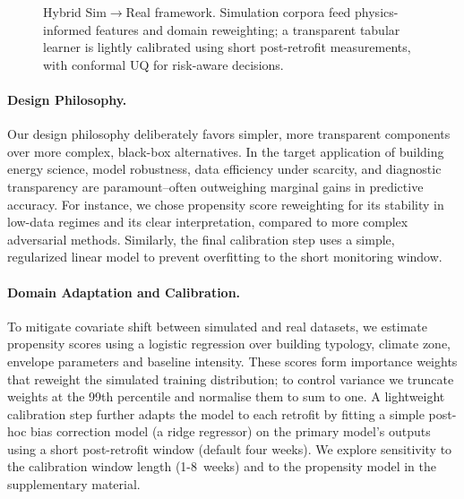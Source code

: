 ﻿\documentclass{article}
\begin{document}
\begin{figure}[t]
\caption{Hybrid Sim$\rightarrow$Real framework. Simulation corpora feed physics-informed features and domain reweighting; a transparent tabular learner is lightly calibrated using short post-retrofit measurements, with conformal UQ for risk-aware decisions.}
\label{fig:hybrid_stack}
\end{figure}

\paragraph{Design Philosophy.} Our design philosophy deliberately favors simpler, more transparent components over more complex, black-box alternatives. In the target application of building energy science, model robustness, data efficiency under scarcity, and diagnostic transparency are paramount--often outweighing marginal gains in predictive accuracy. For instance, we chose propensity score reweighting for its stability in low-data regimes and its clear interpretation, compared to more complex adversarial methods. Similarly, the final calibration step uses a simple, regularized linear model to prevent overfitting to the short monitoring window.

\paragraph{Domain Adaptation and Calibration.} To mitigate covariate shift between simulated and real datasets, we estimate propensity scores using a logistic regression over building typology, climate zone, envelope parameters and baseline intensity.
These scores form importance weights that reweight the simulated training distribution;
to control variance we truncate weights at the 99th percentile and normalise them to sum to one.
A lightweight calibration step further adapts the model to each retrofit by fitting a simple post-hoc bias correction model (a ridge regressor) on the primary model's outputs using a short post-retrofit window (default four weeks).
We explore sensitivity to the calibration window length (1-8~weeks) and to the propensity model in the supplementary material.
\end{document}
